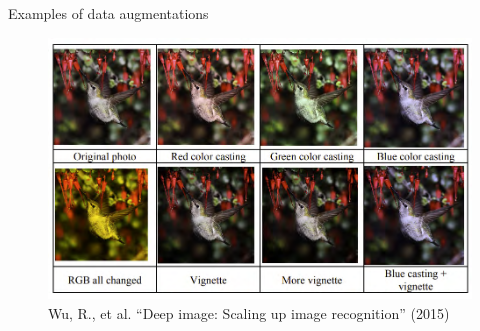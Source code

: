 \documentclass[serif, aspectratio=169]{beamer}
\begin{document}
\begin{frame}{Examples of data augmentations}
	\begin{figure}[htpb]
		\begin{center}
			\includegraphics[keepaspectratio, scale=0.29]{pic/augm}
			\caption*{\scriptsize{Wu, R., et al. ``Deep image: Scaling up image recognition'' (2015)}}
		\end{center}
	\end{figure}
\end{frame}
\end{document}
